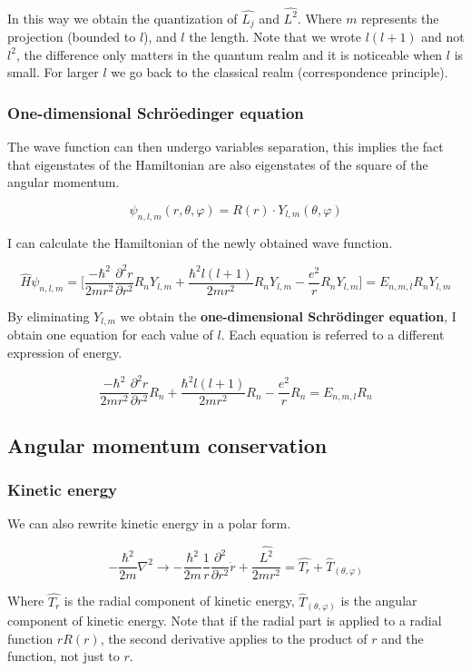		In this way we obtain the quantization of $\hat{L_j}$ and $\hat{L^2}$.
		Where $m$ represents the projection (bounded to $l$), and $l$ the length.
		Note that we wrote $l(l+1)$ and not $l^2$, the difference only matters in the quantum realm and it is noticeable when $l$ is small.
		For larger $l$ we go back to the classical realm (correspondence principle).

		\subsubsection{One-dimensional Schr\"oedinger equation}
		The wave function can then undergo variables separation, this implies the fact that eigenstates of the Hamiltonian are also eigenstates of the square of the angular momentum.

		$$\psi_{n,l,m}(r,\theta,\varphi)=R(r)\cdot Y_{l,m}(\theta,\varphi)$$

		I can calculate the Hamiltonian of the newly obtained wave function.

		$$\hat{H}\psi_{n,l,m}=\bigg[\frac{-\hbar^2}{2mr^2}\frac{\partial^2r}{\partial r^2}R_nY_{l,m}+\frac{\hbar^2l(l+1)}{2mr^2}R_nY_{l,m}-\frac{e^2}{r}R_nY_{l,m}\bigg]=E_{n,m,l}R_nY_{l,m}$$

		By eliminating $Y_{l,m}$ we obtain the \textbf{one-dimensional Schr\"odinger equation}, I obtain one equation for each value of $l$.
		Each equation is referred to a different expression of energy.

		$$\frac{-\hbar^2}{2mr^2}\frac{\partial^2r}{\partial r^2}R_n+\frac{\hbar^2l(l+1)}{2mr^2}R_n-\frac{e^2}{r}R_n=E_{n,m,l}R_n$$

	\subsection{Angular momentum conservation}

		\subsubsection{Kinetic energy}
		We can also rewrite kinetic energy in a polar form.

		$$-\frac{\hbar^2}{2m}\nabla^2 \rightarrow-\frac{\hbar^2}{2m}\frac{1}{r}\frac{\partial^2}{\partial r^2}\dot{r}+\frac{\hat{L^2}}{2mr^2} = \hat{T_r}+\hat{T}_{(\theta,\varphi)}$$

		Where $\hat{T_r}$ is the radial component of kinetic energy, $\hat{T}_{(\theta,\varphi)}$ is the angular component of kinetic energy.
		Note that if the radial part is applied to a radial function $rR(r)$, the second derivative applies to the product of $r$ and the function, not just to $r$.

